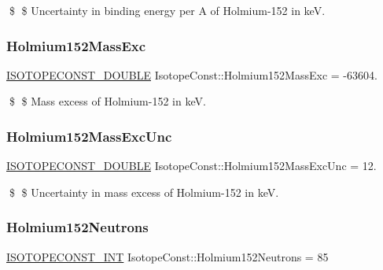 \$ \$ Uncertainty in binding energy per A of Holmium-\/152 in keV. \mbox{\label{group___isotope_const-_holmium-_ho152_ga5903b12d174c6349128848126b5ab7ed}} 
\subsubsection{\texorpdfstring{Holmium152\+Mass\+Exc}{Holmium152MassExc}}
{\footnotesize\ttfamily \mbox{\hyperlink{group___isotope_const-_macros_ga8f45a7272ce02c0b4c65c44636ed719a}{I\+S\+O\+T\+O\+P\+E\+C\+O\+N\+S\+T\+\_\+\+D\+O\+U\+B\+LE}} Isotope\+Const\+::\+Holmium152\+Mass\+Exc = -\/63604.}

\$ \$ Mass excess of Holmium-\/152 in keV. \mbox{\label{group___isotope_const-_holmium-_ho152_gaad736d98a8278e427b0dacc4f3a6de2f}} 
\subsubsection{\texorpdfstring{Holmium152\+Mass\+Exc\+Unc}{Holmium152MassExcUnc}}
{\footnotesize\ttfamily \mbox{\hyperlink{group___isotope_const-_macros_ga8f45a7272ce02c0b4c65c44636ed719a}{I\+S\+O\+T\+O\+P\+E\+C\+O\+N\+S\+T\+\_\+\+D\+O\+U\+B\+LE}} Isotope\+Const\+::\+Holmium152\+Mass\+Exc\+Unc = 12.}

\$ \$ Uncertainty in mass excess of Holmium-\/152 in keV. \mbox{\label{group___isotope_const-_holmium-_ho152_gaea457c49d7eda696af5726f56c48b4d9}} 
\subsubsection{\texorpdfstring{Holmium152\+Neutrons}{Holmium152Neutrons}}
{\footnotesize\ttfamily \mbox{\hyperlink{group___isotope_const-_macros_ga5f18360b3e99483a35c32d789e62621c}{I\+S\+O\+T\+O\+P\+E\+C\+O\+N\+S\+T\+\_\+\+I\+NT}} Isotope\+Const\+::\+Holmium152\+Neutrons = 85}


